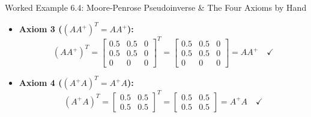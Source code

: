 \begin{examplebox}[breakable]{Worked Example 6.4: Moore-Penrose Pseudoinverse \& The Four Axioms by Hand}
\begin{itemize}
    \begin{equation}
    A^+ (A A^+) = \begin{bmatrix} 0.25 & 0.25 & 0 \\ 0.25 & 0.25 & 0 \end{bmatrix} \begin{bmatrix} 0.5 & 0.5 & 0 \\ 0.5 & 0.5 & 0 \\ 0 & 0 & 0 \end{bmatrix} = \begin{bmatrix} 0.25 & 0.25 & 0 \\ 0.25 & 0.25 & 0 \end{bmatrix} = A^+ \quad \checkmark
    \end{equation}
    \item \textbf{Axiom 3 ($(A A^+)^T = A A^+$):}
    \begin{equation}
    (A A^+)^T = \begin{bmatrix} 0.5 & 0.5 & 0 \\ 0.5 & 0.5 & 0 \\ 0 & 0 & 0 \end{bmatrix}^T = \begin{bmatrix} 0.5 & 0.5 & 0 \\ 0.5 & 0.5 & 0 \\ 0 & 0 & 0 \end{bmatrix} = A A^+ \quad \checkmark
    \end{equation}
    \item \textbf{Axiom 4 ($(A^+ A)^T = A^+ A$):}
    \begin{equation}
    (A^+ A)^T = \begin{bmatrix} 0.5 & 0.5 \\ 0.5 & 0.5 \end{bmatrix}^T = \begin{bmatrix} 0.5 & 0.5 \\ 0.5 & 0.5 \end{bmatrix} = A^+ A \quad \checkmark
    \end{equation}
\end{itemize}


\end{examplebox}
